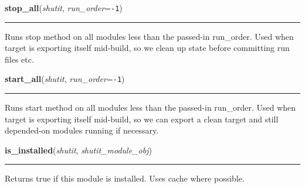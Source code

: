     \label{shutit_main:stop_all}

    \vspace{0.5ex}

\hspace{.8\funcindent}\begin{boxedminipage}{\funcwidth}

    \raggedright \textbf{stop\_all}(\textit{shutit}, \textit{run\_order}={\tt -1})

    \vspace{-1.5ex}

    \rule{\textwidth}{0.5\fboxrule}
\setlength{\parskip}{2ex}
    Runs stop method on all modules less than the passed-in run\_order. 
    Used when target is exporting itself mid-build, so we clean up state 
    before committing run files etc.

\setlength{\parskip}{1ex}
    \end{boxedminipage}

    \label{shutit_main:start_all}

    \vspace{0.5ex}

\hspace{.8\funcindent}\begin{boxedminipage}{\funcwidth}

    \raggedright \textbf{start\_all}(\textit{shutit}, \textit{run\_order}={\tt -1})

    \vspace{-1.5ex}

    \rule{\textwidth}{0.5\fboxrule}
\setlength{\parskip}{2ex}
    Runs start method on all modules less than the passed-in run\_order. 
    Used when target is exporting itself mid-build, so we can export a 
    clean target and still depended-on modules running if necessary.

\setlength{\parskip}{1ex}
    \end{boxedminipage}

    \label{shutit_main:is_installed}

    \vspace{0.5ex}

\hspace{.8\funcindent}\begin{boxedminipage}{\funcwidth}

    \raggedright \textbf{is\_installed}(\textit{shutit}, \textit{shutit\_module\_obj})

    \vspace{-1.5ex}

    \rule{\textwidth}{0.5\fboxrule}
\setlength{\parskip}{2ex}
    Returns true if this module is installed. Uses cache where possible.

\setlength{\parskip}{1ex}
    \end{boxedminipage}

